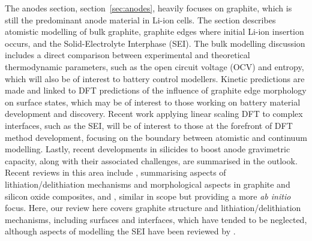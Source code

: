 \documentclass[../main.tex]{subfiles}
\begin{document}

The anodes section, section~\ref{sec:anodes}, heavily focuses on graphite, which is still the predominant anode material in Li-ion cells. The section describes atomistic modelling of bulk graphite, graphite edges where initial Li-ion insertion occurs, and the Solid-Electrolyte Interphase (SEI). The bulk modelling discussion includes a direct comparison between experimental and theoretical thermodynamic parameters, such as the open circuit voltage (OCV) and entropy, which will also be of interest to battery control modellers. Kinetic predictions are made and linked to DFT predictions of the influence of graphite edge morphology on surface states, which may be of interest to those working on battery material development and discovery. Recent work applying linear scaling DFT to complex interfaces, such as the SEI, will be of interest to those at the forefront of DFT method development, focusing on the boundary between atomistic and continuum modelling. Lastly, recent developments in silicides to boost anode gravimetric capacity, along with their associated challenges, are summarised in the outlook. Recent reviews in this area include \citeauthor{asenbauer_success_2020} \cite{asenbauer_success_2020}, summarising aspects of lithiation/delithiation mechanisms and morphological aspects in graphite and silicon oxide composites, and \citeauthor{ZHANG2021147} \cite{ZHANG2021147}, similar in scope but providing a more \textit{ab initio} focus. Here, our review here covers graphite structure and lithiation/delithiation mechanisms, including surfaces and interfaces, which have tended to be neglected, although aspects of modelling the SEI have been reviewed by \citeauthor{Wang2018} \cite{Wang2018}.
\end{document}
